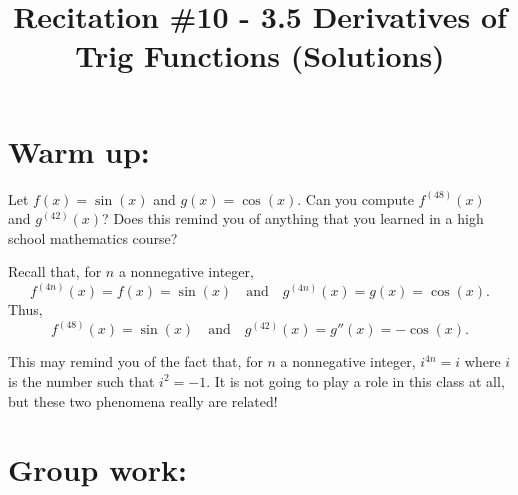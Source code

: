 \documentclass[nooutcomes]{ximera}
\title{Recitation \#10 - 3.5 Derivatives of Trig Functions (Solutions)}
\begin{document}
\begin{abstract}		\end{abstract}
\maketitle

\section*{Warm up:} 
Let $f(x) = \sin(x)$ and $g(x) = \cos(x)$.  Can you compute $f^{(48)}(x)$ and $g^{(42)}(x)$?  Does this remind you of anything that you learned in a high school mathematics course?
	\begin{freeResponse}
	Recall that, for $n$ a nonnegative integer, 
	$$f^{(4n)}(x) = f(x) = \sin(x) \quad \text{and} \quad g^{(4n)}(x) = g(x) = \cos(x).$$
	Thus, 
	$$f^{(48)}(x) = \sin(x) \quad \text{and} \quad g^{(42)}(x) = g''(x) = - \cos(x).$$  

	This may remind you of the fact that, for $n$ a nonnegative integer, $i^{4n} = i$ where $i$ is the number such that $i^2 = -1$.  It is not going to play a role in this class at all, but these two phenomena really are related!
	\end{freeResponse}	
	
	
	
	
	

\section*{Group work:}
\end{document}
